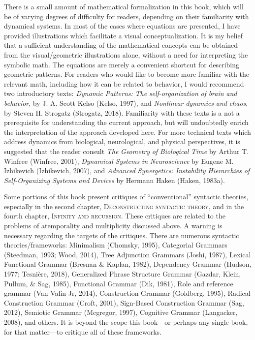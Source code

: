   There is a small amount of mathematical formalization in this book, which will be of varying degrees of difficulty for readers, depending on their familiarity with dynamical systems. In most of the cases where equations are presented, I have provided illustrations which facilitate a visual conceptualization. It is my belief that a sufficient understanding of the mathematical concepts can be obtained from the visual/geometric illustrations alone, without a need for interpreting the symbolic math. The equations are merely a convenient shortcut for describing geometric patterns. For readers who would like to become more familiar with the relevant math, including how it can be related to behavior, I would recommend two introductory texts: \textit{Dynamic} \textit{Patterns:} \textit{The} \textit{self-organization} \textit{of} \textit{brain} \textit{and} \textit{behavior}, by J. A. Scott Kelso (Kelso, 1997), and \textit{Nonlinear} \textit{dynamics} \textit{and} \textit{chaos}, by Steven H. Strogatz (Strogatz, 2018). Familiarity with these texts is a not a prerequisite for understanding the current approach, but will undoubtedly enrich the interpretation of the approach developed here. For more technical texts which address dynamics from biological, neurological, and physical perspectives, it is suggested that the reader consult \textit{The} \textit{Geometry} \textit{of} \textit{Biological} \textit{Time} by Arthur T. Winfree (Winfree, 2001), \textit{Dynamical} \textit{Systems} \textit{in} \textit{Neuroscience} by Eugene M. Izhikevich (Izhikevich, 2007), and \textit{Advanced} \textit{Synergetics:} \textit{Instability} \textit{Hierarchies} \textit{of} \textit{Self-Organizing} \textit{Systems} \textit{and} \textit{Devices} by Hermann Haken (Haken, 1983a).

  Some portions of this book present critiques of “conventional” syntactic theories, especially in the second chapter, \textsc{Deconstructing} \textsc{syntactic} \textsc{theory,} and in the fourth chapter, \textsc{Infinity} \textsc{and} \textsc{recursion}. These critiques are related to the problems of atemporality and multiplicity discussed above. A warning is necessary regarding the targets of the critiques. There are numerous syntactic theories/frameworks: Minimalism (Chomsky, 1995), Categorial Grammars (Steedman, 1993; Wood, 2014), Tree Adjunction Grammars (Joshi, 1987), Lexical Functional Grammar (Bresnan \& Kaplan, 1982), Dependency Grammar (Hudson, 1977; Tesnière, 2018), Generalized Phrase Structure Grammar (Gazdar, Klein, Pullum, \& Sag, 1985), Functional Grammar (Dik, 1981), Role and reference grammar (Van Valin Jr, 2014), Construction Grammar (Goldberg, 1995), Radical Construction Grammar (Croft, 2001), Sign-Based Construction Grammar (Sag, 2012), Semiotic Grammar (Mcgregor, 1997), Cognitive Grammar (Langacker, 2008), and others. It is beyond the scope this book—or perhaps any single book, for that matter—to critique all of these frameworks.

